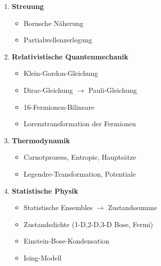 \begin{enumerate}
\item \textbf{Streuung}

  \begin{itemize}
  \item Bornsche Näherung
   \item Partialwellenzerlegung
  \end{itemize}

\item \textbf{Relativistische Quantenmechanik}

  \begin{itemize}
  \item Klein-Gordon-Gleichung
   \item Dirac-Gleichung \(\rightarrow \) Pauli-Gleichung
   \item 16-Fermionen-Bilineare
   \item Lorenztransformation der Fermionen
  \end{itemize}

\item \textbf{Thermodynamik}

  \begin{itemize} 
   \item Carnotprozess, Entropie, Hauptsätze
   \item Legendre-Transformation, Potentiale
  \end{itemize}

\item \textbf{Statistische Physik}

  \begin{itemize}
  \item Statistische Ensembles \(\rightarrow \) Zustandssumme
   \item Zustandsdichte (1-D,2-D,3-D Bose, Fermi)
   \item Einstein-Bose-Kondensation
   \item Ising-Modell
  \end{itemize}


\end{enumerate}



